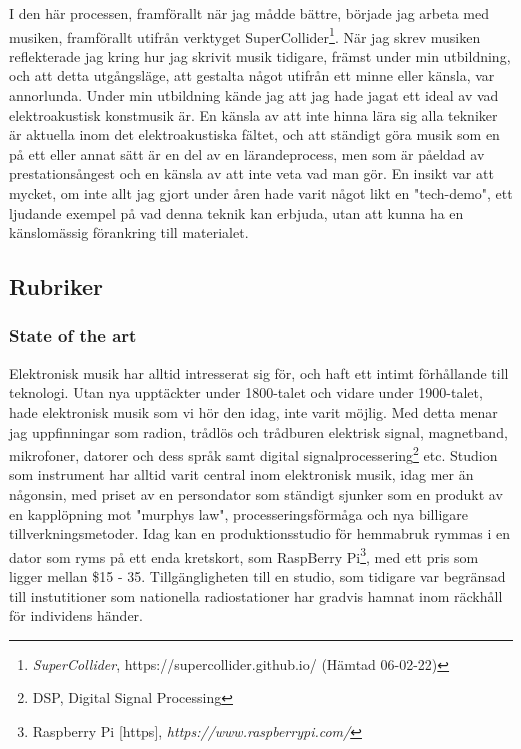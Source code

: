 \documentclass{article}
\begin{document}
I den här processen, framförallt när jag mådde bättre, började jag arbeta med musiken, framförallt utifrån
verktyget SuperCollider\footnote{\emph{SuperCollider}, https://supercollider.github.io/ (Hämtad 06-02-22)}.
När jag skrev musiken reflekterade jag kring hur jag skrivit musik tidigare, främst under min utbildning, och
att detta utgångsläge, att gestalta något utifrån ett minne eller känsla, var annorlunda. Under min utbildning
kände jag att jag hade jagat ett ideal av vad elektroakustisk konstmusik är. En känsla av att inte hinna lära
sig alla tekniker är aktuella inom det elektroakustiska fältet, och att ständigt göra musik som en på ett
eller annat sätt är en del av en lärandeprocess, men som är påeldad av prestationsångest och en känsla av att
inte veta vad man gör. En insikt var att mycket, om inte allt jag gjort under åren hade varit något likt en
"tech-demo", ett ljudande exempel på vad denna teknik kan erbjuda, utan att kunna ha en känslomässig
förankring till materialet. 





\subsection{Rubriker}

\subsubsection{State of the art}

  Elektronisk musik har alltid intresserat sig för, och haft ett intimt förhållande till teknologi. Utan nya
  upptäckter under 1800-talet och vidare under 1900-talet, hade elektronisk musik som vi hör den idag, inte
  varit möjlig. Med detta menar jag uppfinningar som radion, trådlös och trådburen elektrisk signal,
  magnetband, mikrofoner, datorer och dess språk samt digital signalprocessering\footnote{DSP, Digital Signal
  Processing} etc. Studion som instrument har alltid varit central inom elektronisk musik, idag mer än
  någonsin, med priset av en persondator som ständigt sjunker som en produkt av en kapplöpning mot "murphys
  law", processeringsförmåga och nya billigare tillverkningsmetoder. Idag kan en produktionsstudio för
  hemmabruk rymmas i en dator som ryms på ett enda kretskort, som RaspBerry Pi\footnote{Raspberry Pi [https],
  \emph{https://www.raspberrypi.com/}}, med ett pris som
  ligger mellan \$15 - 35. Tillgängligheten till en studio, som tidigare var begränsad till instutitioner som
  nationella radiostationer har gradvis hamnat inom räckhåll för individens händer. 
\end{document}
